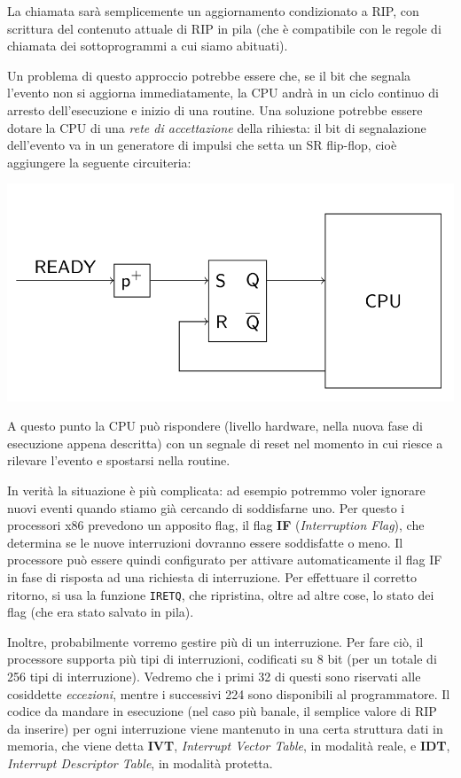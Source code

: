 \documentclass[a4paper,11pt]{article}
\begin{document}
La chiamata sarà semplicemente un aggiornamento condizionato a RIP, con scrittura del contenuto attuale di RIP in pila (che è compatibile con le regole di chiamata dei sottoprogrammi a cui siamo abituati).

Un problema di questo approccio potrebbe essere che, se il bit che segnala l'evento non si aggiorna immediatamente, la CPU andrà in un ciclo continuo di arresto dell'esecuzione e inizio di una routine.
Una soluzione potrebbe essere dotare la CPU di una \textit{rete di accettazione} della rihiesta: il bit di segnalazione dell'evento va in un generatore di impulsi che setta un SR flip-flop, cioè aggiungere la seguente circuiteria:
\begin{center}
	\includegraphics[scale = 0.35]{../figures/int_2.png}
\end{center}

A questo punto la CPU può rispondere (livello hardware, nella nuova fase di esecuzione appena descritta) con un segnale di reset nel momento in cui riesce a rilevare l'evento e spostarsi nella routine. 

In verità la situazione è più complicata: ad esempio potremmo voler ignorare nuovi eventi quando stiamo già cercando di soddisfarne uno.
Per questo i processori x86 prevedono un apposito flag, il flag \textbf{IF} (\textit{Interruption Flag}), che determina se le nuove interruzioni dovranno essere soddisfatte o meno.
Il processore può essere quindi configurato per attivare automaticamente il flag IF in fase di risposta ad una richiesta di interruzione.
Per effettuare il corretto ritorno, si usa la funzione \lstinline|IRETQ|, che ripristina, oltre ad altre cose, lo stato dei flag (che era stato salvato in pila).

Inoltre, probabilmente vorremo gestire più di un interruzione.
Per fare ciò, il processore supporta più tipi di interruzioni, codificati su 8 bit (per un totale di 256 tipi di interruzione).
Vedremo che i primi 32 di questi sono riservati alle cosiddette \textit{eccezioni}, mentre i successivi 224 sono disponibili al programmatore.
Il codice da mandare in esecuzione (nel caso più banale, il semplice valore di RIP da inserire) per ogni interruzione viene mantenuto in una certa struttura dati in memoria, che viene detta \textbf{IVT}, \textit{Interrupt Vector Table}, in modalità reale, e \textbf{IDT}, \textit{Interrupt Descriptor Table}, in modalità protetta.
\end{document}
